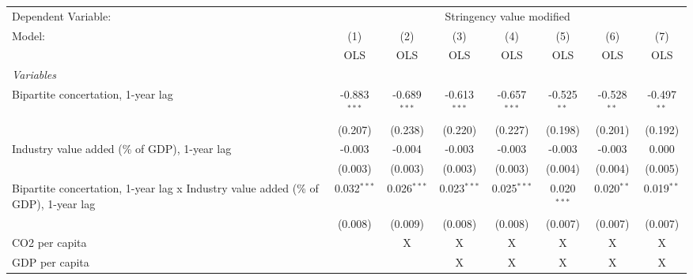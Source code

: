 
\begingroup
\centering
\begin{tabular}{lccccccc}
   \toprule
   Dependent Variable: & \multicolumn{7}{c}{Stringency value modified}\\
   Model:                                                                             & (1)            & (2)            & (3)            & (4)            & (5)           & (6)           & (7)\\  
                                                                                      &  OLS           & OLS            & OLS            & OLS            & OLS           & OLS           & OLS\\  
   \midrule
   \emph{Variables}\\
   Bipartite concertation, 1-year lag                                                 & -0.883$^{***}$ & -0.689$^{***}$ & -0.613$^{***}$ & -0.657$^{***}$ & -0.525$^{**}$ & -0.528$^{**}$ & -0.497$^{**}$\\   
                                                                                      & (0.207)        & (0.238)        & (0.220)        & (0.227)        & (0.198)       & (0.201)       & (0.192)\\   
   Industry value added (\% of GDP), 1-year lag                                       & -0.003         & -0.004         & -0.003         & -0.003         & -0.003        & -0.003        & 0.000\\   
                                                                                      & (0.003)        & (0.003)        & (0.003)        & (0.003)        & (0.004)       & (0.004)       & (0.005)\\   
   Bipartite concertation, 1-year lag x Industry value added (\% of GDP), 1-year lag  & 0.032$^{***}$  & 0.026$^{***}$  & 0.023$^{***}$  & 0.025$^{***}$  & 0.020$^{***}$ & 0.020$^{**}$  & 0.019$^{**}$\\   
                                                                                      & (0.008)        & (0.009)        & (0.008)        & (0.008)        & (0.007)       & (0.007)       & (0.007)\\   
   CO2 per capita                                                                     &                & X              & X              & X              & X             & X             & X\\  
   GDP per capita                                                                     &                &                & X              & X              & X             & X             & X\\  

\end{tabular}
